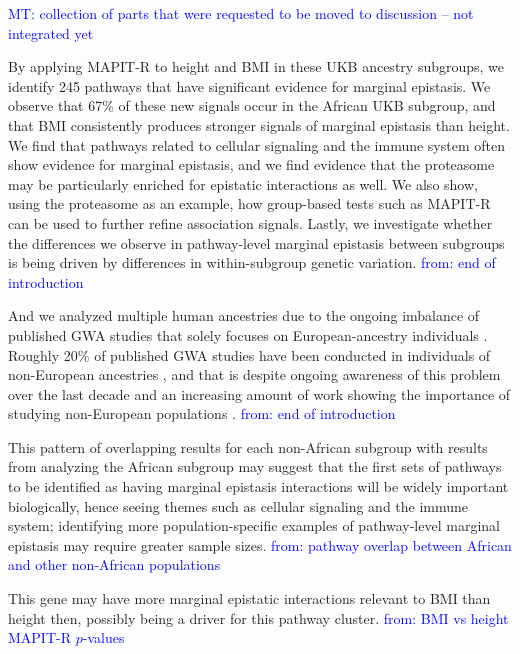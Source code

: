 \documentclass[12pt,a4paper]{article}
\begin{document}
\textcolor{blue}{MT: collection of parts that were requested to be moved to discussion -- not integrated yet}

By applying MAPIT-R to height and BMI in these UKB ancestry subgroups, we identify 245 pathways that have significant evidence for marginal epistasis. We observe that 67\% of these new signals occur in the African UKB subgroup, and that BMI consistently produces stronger signals of marginal epistasis than height. We find that pathways related to cellular signaling and the immune system often show evidence for marginal epistasis, and we find evidence that the proteasome may be particularly enriched for epistatic interactions as well. We also show, using the proteasome as an example, how group-based tests such as MAPIT-R can be used to further refine association signals. Lastly, we investigate whether the differences we observe in pathway-level marginal epistasis between subgroups is being driven by differences in within-subgroup genetic variation. \textcolor{blue}{from: end of introduction }

And we analyzed multiple human ancestries due to the ongoing imbalance of published GWA studies that solely focuses on European-ancestry individuals \citep{Need2009,Popejoy2016,Gurdasani2019,Martin2019,Sirugo2019}. Roughly 20\% of published GWA studies have been conducted in individuals of non-European ancestries \citep{Gurdasani2019,Martin2019,Sirugo2019}, and that is despite ongoing awareness of this problem over the last decade \citep{Need2009,Popejoy2016} and an increasing amount of work showing the importance of studying non-European populations \citep{Dumitrescu2011,Martin2017a,Martin2017b,Mogil2018,Bien2019,Duncan2019,Kuchenbaecker2019,Wojcik2019,Zhong2019,Marnetto2020,Mostafavi2020}. \textcolor{blue}{from: end of introduction }

This pattern of overlapping results for each non-African subgroup with results from analyzing  the African subgroup may suggest that the first sets of pathways to be identified as having marginal epistasis interactions will be widely important biologically, hence seeing themes such as cellular signaling and the immune system; identifying more population-specific examples of pathway-level marginal epistasis may require greater sample sizes. \textcolor{blue}{from: pathway overlap between African and other non-African populations}

 This gene may have more marginal epistatic interactions relevant to BMI than height then, possibly being a driver for this pathway cluster. \textcolor{blue}{from: BMI vs height MAPIT-R $p$-values}
\end{document}
